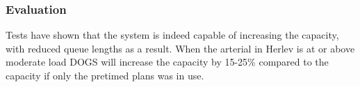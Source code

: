 

\subsubsection*{Evaluation}

Tests have shown that the system is indeed capable of increasing the
capacity, with reduced queue lengths as a result. When the arterial in
Herlev is at or above moderate load DOGS will increase the capacity by
15-25\% compared to the capacity if only the pretimed plans was in
use.
